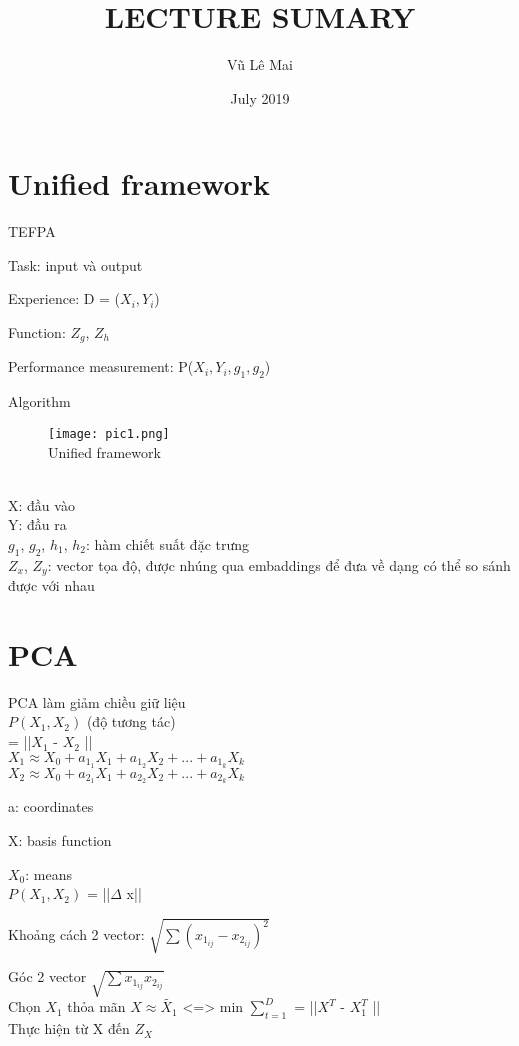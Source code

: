 \documentclass{article}
\title{LECTURE SUMARY}
\author{Vũ Lê Mai}
\date{July 2019}
\begin{document}
\maketitle
\section{Unified framework}
    TEFPA

    Task: input và output

    Experience:  D = ($X_i,Y_i$)

    Function: $Z_g$, $Z_h$

    Performance measurement: P($X_i, Y_i, g_1,g_2$)

    Algorithm\\
\begin{figure}[h!]
\centering\texttt{[image: pic1.png]}
\\Unified framework\\
\end{figure}\\
    X: đầu vào\\
    Y: đầu ra\\
    $g_1$, $g_2$, $h_1$, $h_2$: hàm chiết suất đặc trưng\\
    $Z_x$, $Z_y$: vector tọa độ, được nhúng qua embaddings để đưa về dạng có thể so sánh được với nhau
\section{PCA}
    PCA làm giảm chiều giữ liệu\\
    $P(X_{1}, X_{2})$ (độ tương tác) \\
    = ||$X_{1}$ - $X_{2}$ || \\
    $X_{1} \approx X_{0} + a_{1_{1}}X_{1} + a_{1_{2}}X_{2} + ... + a_{1_{k}}X_{k}$\\
    $X_{2} \approx X_{0} + a_{2_{1}}X_{1} + a_{2_{2}}X_{2} + ... + a_{2_{k}}X_{k} $

    a: coordinates

    X: basis function

    $X_{0}$: means\\
    $P(X_{1}, X_{2})$ = ||$\Delta$ x||

    Khoảng cách 2 vector: $\sqrt{\sum \left ( x_{1_{ij}} - x_{2_{ij}}\right )^{2}}$

    Góc 2 vector $\sqrt{\sum x_{1_{ij}} x_{2_{ij}}} $\\
    Chọn $X_{1}$ thỏa mãn $X \approx \tilde{X_{1}}$
    <=> min $\sum_{t=1}^{D}$ = ||$X^{T}$ - $X^{T}_{1}$ ||\\
    Thực hiện từ X đến $Z_X$
\end{document}
